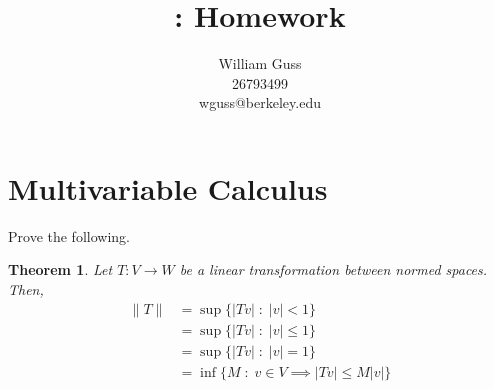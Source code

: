 \documentclass[letter]{article}
\title{\bCLASS: Homework \bHWN}
\author{William Guss\\26793499\\wguss@berkeley.edu}
\newtheorem{theorem}{Theorem}
\newenvironment{menumerate}{%
  \edef\backupindent{\the\parindent}%
  \enumerate%
  \setlength{\parindent}{\backupindent}%
}{\endenumerate}
\begin{document}
\maketitle
\thispagestyle{empty}


\setcounter{section}{4}
\section{Multivariable Calculus}
\begin{menumerate}
	\setcounter{enumi}{2}
	\item %
	Prove the following.
	\begin{theorem}
		Let $T: V\to W$ be a linear transformation between normed spaces. Then, 
		\begin{equation}
			\begin{aligned}
				\|T\| &= \sup \{|Tv|\;:\;|v| < 1 \} \\
				 &= \sup \{|Tv|\;:\;|v| \leq 1 \} \\
				 &= \sup \{|Tv|\;:\;|v| = 1 \} \\
				 &= \inf \{M\;:\;v \in V \implies |Tv| \leq M|v| \}
			\end{aligned}
		\end{equation}
	\end{theorem}

	\setcounter{enumi}{3}
	\item %

	\setcounter{enumi}{5}
	\item %

	\setcounter{enumi}{11}
	\item %

	\item %
\end{menumerate}
\end{document}
